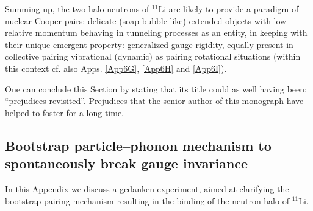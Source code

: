 Summing up, the two halo neutrons of $^{11}$Li are likely to provide a paradigm of nuclear Cooper pairs: delicate (soap bubble like) extended objects with low relative momentum behaving in tunneling processes as an entity, in keeping with their unique emergent property: generalized gauge rigidity, equally present in collective pairing vibrational (dynamic) as pairing rotational situations (within this context cf. also Apps. \ref{App6G}, \ref{App6H} and \ref{App6I}).



One can conclude this Section by stating that its title could as well having been:  ``prejudices revisited''. Prejudices that the senior author of this monograph have helped to foster for a long time.

\begin{subappendices}
\section[Bootstrap mechanism to break gauge invariance]{Bootstrap particle--phonon mechanism to spontaneously break gauge invariance}\label{C8AppA}
In this Appendix we discuss a gedanken experiment, aimed at clarifying the bootstrap pairing mechanism resulting in the binding of the neutron halo of $^{11}$Li. 

\end{subappendices}
